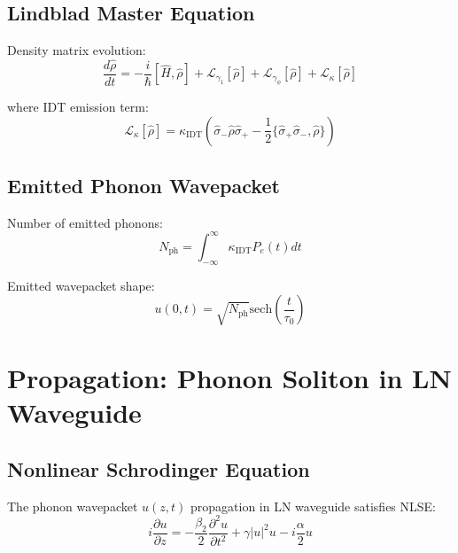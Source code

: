 \documentclass[12pt,a4paper]{article}
\theoremstyle{definition}
\begin{document}
\subsection{Lindblad Master Equation}

Density matrix evolution:
\begin{equation}
\frac{d\hat{\rho}}{dt} = -\frac{i}{\hbar}[\hat{H},\hat{\rho}] + \mathcal{L}_{\gamma_1}[\hat{\rho}] + \mathcal{L}_{\gamma_\phi}[\hat{\rho}] + \mathcal{L}_{\kappa}[\hat{\rho}]
\end{equation}

where IDT emission term:
\begin{equation}
\mathcal{L}_{\kappa}[\hat{\rho}] = \kappa_{\text{IDT}}\left(\hat{\sigma}_-\hat{\rho}\hat{\sigma}_+ - \frac{1}{2}\{\hat{\sigma}_+\hat{\sigma}_-,\hat{\rho}\}\right)
\end{equation}

\subsection{Emitted Phonon Wavepacket}

Number of emitted phonons:
\begin{equation}
N_{\text{ph}} = \int_{-\infty}^{\infty}\kappa_{\text{IDT}}P_e(t)dt
\end{equation}

Emitted wavepacket shape:
\begin{equation}
u(0,t) = \sqrt{N_{\text{ph}}}\text{sech}\left(\frac{t}{\tau_0}\right)
\end{equation}

\section{Propagation: Phonon Soliton in LN Waveguide}

\subsection{Nonlinear Schrodinger Equation}

The phonon wavepacket $u(z,t)$ propagation in LN waveguide satisfies NLSE:
\begin{equation}
i\frac{\partial u}{\partial z} = -\frac{\beta_2}{2}\frac{\partial^2 u}{\partial t^2} + \gamma|u|^2u - i\frac{\alpha}{2}u
\label{eq:NLSE_loss}
\end{equation}
\end{document}
